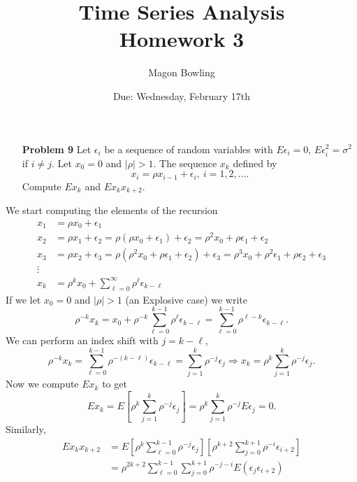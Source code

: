 \documentclass[11pt]{article}
\theoremstyle{definition}
\newcommand{\1}[1]{\mathbf{1} \left \{ #1 \right \}}
\begin{document}
\title{Time Series Analysis \\ Homework 3}
\date{Due: Wednesday, February 17th}
\author{Magon Bowling}

\maketitle

\begin{itemize}
    \item [{\color{red} \textbf{Problem 9}}] Let $\epsilon_i$ be a sequence of random variables with $E\epsilon_i = 0$, $E\epsilon_i^2 = \sigma^2$ if $i \neq j$.  Let $x_0 = 0$ and $|\rho| > 1$.  The sequence $x_k$ defined by
    \[x_i = \rho x_{i-1} + \epsilon_i, \ i = 1,2,....\]
    Compute $Ex_k$ and $Ex_k x_{k+2}$.
\end{itemize}
We start computing the elements of the recursion
\begin{equation*}
    \begin{split}
        x_1 &= \rho x_0 + \epsilon_1 \\
        x_2 &= \rho x_1 + \epsilon_2 = \rho(\rho x_0 + \epsilon_1) + \epsilon_2 = \rho^2 x_0 + \rho \epsilon_1 + \epsilon_2 \\
        x_3 &= \rho x_2 + \epsilon_3 = \rho(\rho^2 x_0 + \rho \epsilon_1 + \epsilon_2) + \epsilon_3 = \rho^3 x_0 + \rho^2 \epsilon_1 + \rho \epsilon_2 + \epsilon_3 \\
        \vdots \\
        x_k &= \rho^k x_0 + \sum_{\ell=0}^{\infty} \rho^{\ell} \epsilon_{k-\ell}
    \end{split}
\end{equation*}
If we let $x_0 = 0$ and $|\rho| > 1$ (an Explosive case) we write
\[\rho^{-k} x_k = x_0 + \rho^{-k} \sum_{\ell=0}^{k-1} \rho^{\ell} \epsilon_{k-\ell} = \sum_{\ell=0}^{k-1} \rho^{\ell-k} \epsilon_{k-\ell}.\]
We can perform an index shift with $j = k - \ell$,
\[\rho^{-k}x_k = \sum_{\ell=0}^{k-1} \rho^{-(k-\ell)} \epsilon_{k-\ell} = \sum_{j=1}^k \rho^{-j} \epsilon_j \Rightarrow x_k = \rho^k \sum_{j=1}^k \rho^{-j} \epsilon_j.\]
Now we compute $Ex_k$ to get
\[Ex_k = E\left[\rho^k \sum_{j=1}^k \rho^{-j} \epsilon_j\right] = \rho^k \sum_{j=1}^k \rho^{-j} E\epsilon_j = 0.\]
Similarly,
\begin{align*}
    Ex_k x_{k+2} &= E\left[\rho^k \sum_{\ell=0}^{k-1} \rho^{-j} \epsilon_j\right]\left[\rho^{k+2} \sum_{j=0}^{k+1} \rho^{-i} \epsilon_{i+2}\right] \\
    &= \rho^{2k+2} \sum_{\ell=0}^{k-1} \sum_{j=0}^{k+1} \rho^{-j-i} E(\epsilon_j \epsilon_{i+2})
\end{align*}
\end{document}
